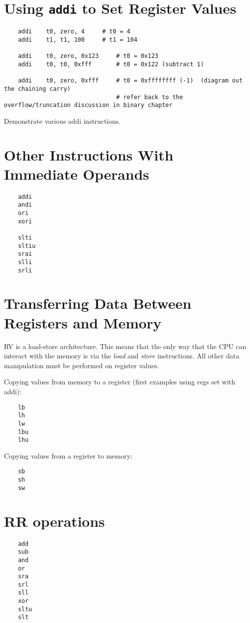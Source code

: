 \section{Using {\tt addi} to Set Register Values}
\begin{verbatim}
    addi    t0, zero, 4     # t0 = 4
    addi    t1, t1, 100     # t1 = 104

    addi    t0, zero, 0x123     # t0 = 0x123
    addi    t0, t0, 0xfff       # t0 = 0x122 (subtract 1)

    addi    t0, zero, 0xfff     # t0 = 0xffffffff (-1)  (diagram out the chaining carry)
                                # refer back to the overflow/truncation discussion in binary chapter
\end{verbatim}

Demonstrate various addi instructions. 



\section{Other Instructions With Immediate Operands}
\begin{verbatim}
    addi
    andi
    ori
    xori

    slti
    sltiu
    srai
    slli
    srli
\end{verbatim}


\section{Transferring Data Between Registers and Memory}

RV is a load-store architecture.  This means that the only way that the
CPU can interact with the memory is via the {\em load} and {\em store}
instructions.  All other data manipulation must be performed on register
values.

Copying values from memory to a register (first examples using regs set with addi):
\begin{verbatim}
    lb
    lh
    lw
    lbu
    lhu
\end{verbatim}

Copying values from a register to memory:
\begin{verbatim}
    sb
    sh
    sw
\end{verbatim}


\section{RR operations}
\begin{verbatim}
    add
    sub
    and
    or
    sra
    srl
    sll
    xor
    sltu
    slt
\end{verbatim}


